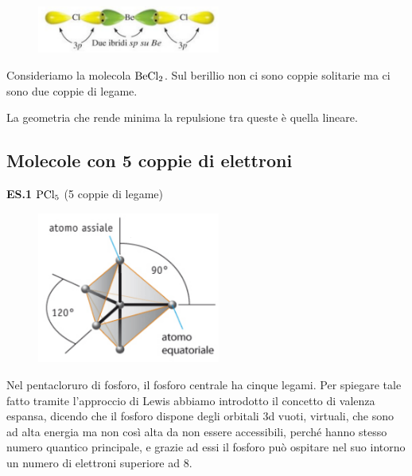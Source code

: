 \begin{minipage}{0.4\textwidth}
    \begin{figure}[H]
        \includegraphics[width=6cm]{immagini/BeCl_2.png}
    \end{figure}
\end{minipage}
\hfill
\begin{minipage}{0.55\textwidth}
\vspace{0.4cm}Consideriamo la molecola $\rm BeCl_2$. Sul berillio non ci sono coppie solitarie ma ci sono due coppie di legame.

La geometria che rende minima la repulsione tra queste è quella lineare.
\end{minipage}

\subsection{Molecole con 5 coppie di elettroni}
\textbf{ES.1} $\rm PCl_5$ (5 coppie di legame)

\begin{minipage}{0.4\textwidth}
    \begin{figure}[H]
        \includegraphics[width=6cm]{immagini/PCl_5.png}
    \end{figure}
\end{minipage}
\hfill
\begin{minipage}{0.55\textwidth}
    \vspace{0.2cm}Nel pentacloruro di fosforo, il fosforo centrale ha cinque legami. Per spiegare tale fatto tramite l'approccio di Lewis abbiamo introdotto il concetto di valenza espansa, dicendo che il fosforo dispone degli orbitali 3d vuoti, virtuali, che sono ad alta energia ma non così alta da non essere accessibili, perché hanno stesso numero quantico principale, e grazie ad essi il fosforo può ospitare nel suo intorno un numero di elettroni superiore ad 8.
\end{minipage}

